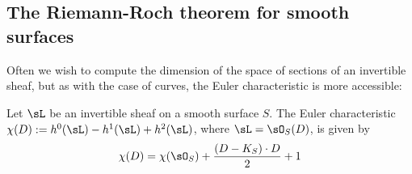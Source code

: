 %
%
%
%

\subsection{The Riemann-Roch theorem for smooth surfaces}
Often we wish to compute the dimension of the space of sections of an invertible sheaf, but
as with the case of curves, the Euler characteristic is more accessible:


\begin{theorem} Let $\sL$ be an invertible sheaf on a smooth surface $S$.
The Euler characteristic $\chi(D) := h^0(\sL)-h^1(\sL)+h^2(\sL)$, where $\sL = \sO_S(D)$, is given by
$$
\chi(D) = \chi(\sO_S) + \frac{(D-K_S)\cdot D}{2}+1
$$
\end{theorem}

